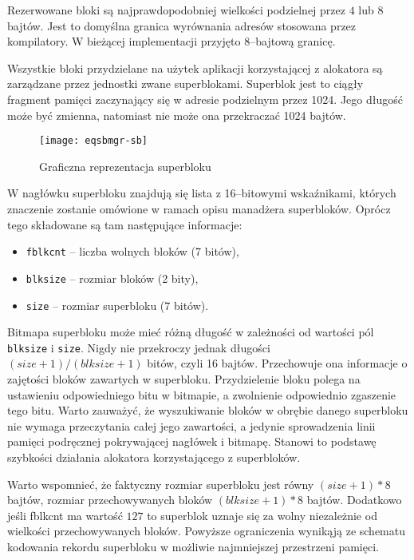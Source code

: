 \documentclass[12pt,a4paper,titlepage,twoside]{mwart}
\begin{document}
Rezerwowane bloki są najprawdopodobniej wielkości podzielnej przez $4$ lub $8$
bajtów. Jest to domyślna granica wyrównania adresów stosowana przez
kompilatory. W bieżącej implementacji przyjęto $8$--bajtową granicę.

Wszystkie bloki przydzielane na użytek aplikacji korzystającej z alokatora są
zarządzane przez jednostki zwane superblokami. Superblok jest to ciągły
fragment pamięci zaczynający się w adresie podzielnym przez 1024. Jego długość
może być zmienna, natomiast nie może ona przekraczać 1024 bajtów.

\begin{figure}[ht]
\centering
\texttt{[image: eqsbmgr-sb]}
\caption{Graficzna reprezentacja superbloku}
\end{figure}

W nagłówku superbloku znajdują się lista z 16--bitowymi wskaźnikami, których
znaczenie zostanie omówione w ramach opisu manadżera superbloków. Oprócz tego
składowane są tam następujące informacje:
\begin{itemize}
\item \texttt{fblkcnt} -- liczba wolnych bloków (7 bitów),
\item \texttt{blksize} -- rozmiar bloków (2 bity),
\item \texttt{size} -- rozmiar superbloku (7 bitów).
\end{itemize}

Bitmapa superbloku może mieć różną długość w zależności od wartości pól
\texttt{blksize} i \texttt{size}. Nigdy nie przekroczy jednak długości $(size +
1) / (blksize + 1)$ bitów, czyli 16 bajtów. Przechowuje ona informacje o
zajętości bloków zawartych w superbloku. Przydzielenie bloku polega na
ustawieniu odpowiedniego bitu w bitmapie, a zwolnienie odpowiednio zgaszenie
tego bitu. Warto zauważyć, że wyszukiwanie bloków w obrębie danego superbloku
nie wymaga przeczytania całej jego zawartości, a jedynie sprowadzenia linii
pamięci podręcznej pokrywającej nagłówek i bitmapę. Stanowi to podstawę
szybkości działania alokatora korzystającego z superbloków.

Warto wspomnieć, że faktyczny rozmiar superbloku jest równy $(size + 1) * 8$
bajtów, rozmiar przechowywanych bloków $(blksize + 1) * 8$ bajtów. Dodatkowo
jeśli fblkcnt ma wartość $127$ to superblok uznaje się za wolny niezależnie od
wielkości przechowywanych bloków. Powyższe ograniczenia wynikąją ze schematu
kodowania rekordu superbloku w możliwie najmniejszej przestrzeni pamięci.
\end{document}
